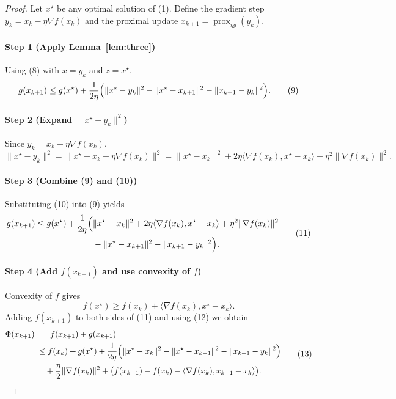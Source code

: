 \documentclass{article}
\newcommand{\prox}{\operatorname{prox}}
\begin{document}
\begin{proof}
Let $x^{\star}$ be any optimal solution of (1).  
Define the gradient step $y_{k}=x_{k}-\eta\nabla f(x_{k})$ and the proximal update $x_{k+1}=\prox_{\eta g}(y_{k})$.

\paragraph{Step 1 (Apply Lemma~\ref{lem:three})}
Using (8) with $x=y_{k}$ and $z=x^{\star}$,
\[
g(x_{k+1})\le g(x^{\star})
+\frac{1}{2\eta}\Bigl(\|x^{\star}-y_{k}\|^{2}
-\|x^{\star}-x_{k+1}\|^{2}
-\|x_{k+1}-y_{k}\|^{2}\Bigr).
\tag{9}
\]
\paragraph{Step 2 (Expand $\|x^{\star}-y_{k}\|^{2}$)}
Since $y_{k}=x_{k}-\eta\nabla f(x_{k})$,
\[
\|x^{\star}-y_{k}\|^{2}
=\|x^{\star}-x_{k}+\eta\nabla f(x_{k})\|^{2}
=\|x^{\star}-x_{k}\|^{2}
+2\eta\langle\nabla f(x_{k}),x^{\star}-x_{k}\rangle
+\eta^{2}\|\nabla f(x_{k})\|^{2}.
\tag{10}
\]

\paragraph{Step 3 (Combine (9) and (10))}
Substituting (10) into (9) yields
\[
\begin{aligned}
g(x_{k+1})\le g(x^{\star})+\frac{1}{2\eta}\Bigl(&\|x^{\star}-x_{k}\|^{2}
+2\eta\langle\nabla f(x_{k}),x^{\star}-x_{k}\rangle
+\eta^{2}\|\nabla f(x_{k})\|^{2}\\
&-\|x^{\star}-x_{k+1}\|^{2}
-\|x_{k+1}-y_{k}\|^{2}\Bigr).
\end{aligned}
\tag{11}
\]

\paragraph{Step 4 (Add $f(x_{k+1})$ and use convexity of $f$)}
Convexity of $f$ gives
\[
f(x^{\star})\ge f(x_{k})+\langle\nabla f(x_{k}),x^{\star}-x_{k}\rangle.
\tag{12}
\]
Adding $f(x_{k+1})$ to both sides of (11) and using (12) we obtain
\[
\begin{aligned}
\Phi(x_{k+1})\;&=\;f(x_{k+1})+g(x_{k+1})\\
&\le f(x_{k})+g(x^{\star})+\frac{1}{2\eta}\Bigl(\|x^{\star}-x_{k}\|^{2}
-\|x^{\star}-x_{k+1}\|^{2}
-\|x_{k+1}-y_{k}\|^{2}\Bigr)\\
&\quad+\frac{\eta}{2}\|\nabla f(x_{k})\|^{2}
+\bigl(f(x_{k+1})-f(x_{k})-\langle\nabla f(x_{k}),x_{k+1}-x_{k}\rangle\bigr).
\end{aligned}
\tag{13}
\]


\end{proof}
\end{document}
